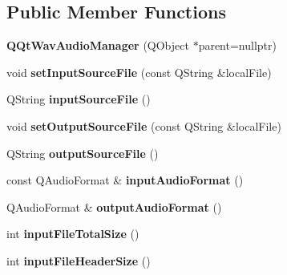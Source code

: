 \subsection*{Public Member Functions}
\begin{DoxyCompactItemize}
\item 
\mbox{\label{class_q_qt_wav_audio_manager_a494baac7df36d732964e5c4bc93e2131}} 
{\bfseries Q\+Qt\+Wav\+Audio\+Manager} (Q\+Object $\ast$parent=nullptr)
\item 
\mbox{\label{class_q_qt_wav_audio_manager_adccd0b5c223e1e8777601999eaeddd92}} 
void {\bfseries set\+Input\+Source\+File} (const Q\+String \&local\+File)
\item 
\mbox{\label{class_q_qt_wav_audio_manager_a07f6a3c5e8925fa491a7d65169448b3e}} 
Q\+String {\bfseries input\+Source\+File} ()
\item 
\mbox{\label{class_q_qt_wav_audio_manager_a7abd178521d2867a6fecdd69cb942f90}} 
void {\bfseries set\+Output\+Source\+File} (const Q\+String \&local\+File)
\item 
\mbox{\label{class_q_qt_wav_audio_manager_a21db7c8299c203f770466a5f5734c2cf}} 
Q\+String {\bfseries output\+Source\+File} ()
\item 
\mbox{\label{class_q_qt_wav_audio_manager_af6e4a211c2705290109542c415c1f652}} 
const Q\+Audio\+Format \& {\bfseries input\+Audio\+Format} ()
\item 
\mbox{\label{class_q_qt_wav_audio_manager_a2752e34451d176d0e62d3f0ff651f322}} 
Q\+Audio\+Format \& {\bfseries output\+Audio\+Format} ()
\item 
\mbox{\label{class_q_qt_wav_audio_manager_acc0e31f5ccfbc527cba4a389291e0fed}} 
int {\bfseries input\+File\+Total\+Size} ()
\item 
\mbox{\label{class_q_qt_wav_audio_manager_ad11c73cafa01877c20b06ef2023b06f3}} 
int {\bfseries input\+File\+Header\+Size} ()

\end{DoxyCompactItemize}
